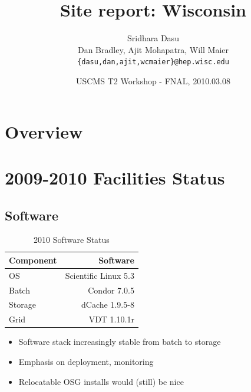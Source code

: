 \documentclass{beamer}
\title{Site report: Wisconsin}
\author[Maier]{
	Sridhara Dasu \\
	Dan Bradley, Ajit Mohapatra, Will Maier
	{\tt \{dasu,dan,ajit,wcmaier\}@hep.wisc.edu}}
\institute[Wisconsin]{University of Wisconsin - High Energy Physics}
\date[2010.03.08]{USCMS T2 Workshop - FNAL, 2010.03.08}
\begin{document}

\begin{frame}
	\titlepage
\end{frame}

\section{Overview}
\begin{frame}
	\tableofcontents
\end{frame}

\section{2009-2010 Facilities Status}
\subsection{Software}
\begin{frame}
\begin{table}
\begin{tabular}{lr}
	\toprule
	Component	 	&	 Software \\
	\midrule
	OS					&	 Scientific Linux 5.3 \\
	Batch			 	&	 Condor 7.0.5 \\ %
	Storage		 	&	 dCache 1.9.5-8 \\ %
	Grid				&	 VDT 1.10.1r \\ %
	\bottomrule
\end{tabular}
\caption{2010 Software Status}
\label{2010_software_status}
\end{table}

\begin{itemize}
	\item Software stack increasingly stable from batch to storage
	\item Emphasis on deployment, monitoring
	\item Relocatable OSG installs would (still) be nice
\end{itemize}

\end{frame}
\end{document}
